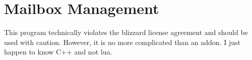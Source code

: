 %
%
%
%
%
%
%

\section{Mailbox Management} \label{WoWMailbox}

\begin{note}
	This program technically violates the blizzard license agreement and should be used with caution. However, it is no more complicated than an addon. I just happen to know C++ and not lua.
\end{note}

